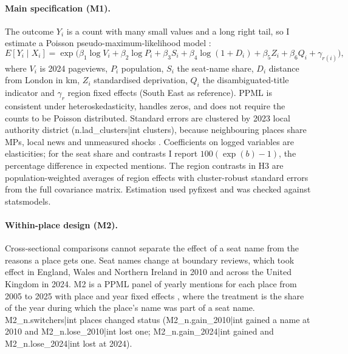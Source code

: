\documentclass[11pt,a4paper]{article}
\begin{document}
\paragraph{Main specification (M1).} The outcome $Y_i$ is a count with many small values and a long right tail, so I estimate a Poisson pseudo-maximum-likelihood model \citep{SantosSilvaTenreyro2006}:
\begin{equation}
E[Y_i \mid X_i] = \exp\big(\beta_1 \log V_i + \beta_2 \log P_i + \beta_3 S_i + \beta_4 \log(1 + D_i) + \beta_5 Z_i + \beta_6 Q_i + \gamma_{r(i)}\big),
\end{equation}
where $V_i$ is 2024 pageviews, $P_i$ population, $S_i$ the seat-name share, $D_i$ distance from London in km, $Z_i$ standardised deprivation, $Q_i$ the disambiguated-title indicator and $\gamma_r$ region fixed effects (South East as reference). PPML is consistent under heteroskedasticity, handles zeros, and does not require the counts to be Poisson distributed. Standard errors are clustered by 2023 local authority district ({{n.lad_clusters|int}} clusters), because neighbouring places share MPs, local news and unmeasured shocks \citep{CameronMiller2015,Abadie2023}. Coefficients on logged variables are elasticities; for the seat share and contrasts I report $100(\exp(b)-1)$, the percentage difference in expected mentions. The region contrasts in H3 are population-weighted averages of region effects with cluster-robust standard errors from the full covariance matrix. Estimation used pyfixest and was checked against statsmodels.

\paragraph{Within-place design (M2).} Cross-sectional comparisons cannot separate the effect of a seat name from the reasons a place gets one. Seat names change at boundary reviews, which took effect in England, Wales and Northern Ireland in 2010 and across the United Kingdom in 2024. M2 is a PPML panel of yearly mentions for each place from 2005 to 2025 with place and year fixed effects \citep{Correia2020}, where the treatment is the share of the year during which the place's name was part of a seat name. {{M2_n.switchers|int}} places changed status ({{M2_n.gain_2010|int}} gained a name at 2010 and {{M2_n.lose_2010|int}} lost one; {{M2_n.gain_2024|int}} gained and {{M2_n.lose_2024|int}} lost at 2024).
\end{document}
